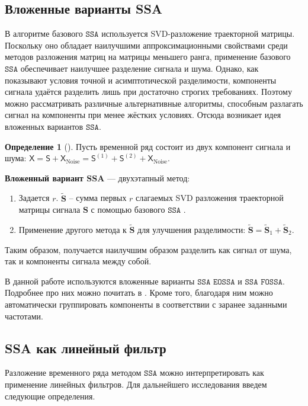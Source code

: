 \documentclass[12pt, specialist, subf
]{disser}
\theoremstyle{definition}
\newcommand{\SSA}{\texttt{SSA}}
\newcommand{\EOSSA}{\texttt{SSA EOSSA}}
\newcommand{\FOSSA}{\texttt{SSA FOSSA}}
\newcommand{\TS}{\mathsf{X}}
\newtheorem{definition}{Определение} %
\begin{document}
\subsection{Вложенные варианты SSA}
\label{sec:eossa_and_autogroup}

В алгоритме базового $\SSA$ используется SVD-разложение траекторной матрицы. Поскольку оно обладает наилучшими аппроксимационными свойствами среди методов разложения матриц на матрицы меньшего ранга, применение базового $\SSA$ обеспечивает наилучшее разделение сигнала и шума. Однако, как показывают условия точной и асимптотической разделимости, компоненты сигнала удаётся разделить лишь при достаточно строгих требованиях. Поэтому можно рассматривать различные альтернативные алгоритмы, способным разлагать сигнал на компоненты при менее жёстких условиях.
Отсюда возникает идея вложенных вариантов $\SSA$.

\begin{definition}[\cite{Golyandina_2015}]

	Пусть временной ряд состоит из двух компонент сигнала и шума: $\TS = \mathsf{S} + \TS_{\mathrm{Noise}}=
		\mathsf{S}^{(1)} + \mathsf{S}^{(2)} + \TS_{\mathrm{Noise}}$.

	\textbf{Вложенный вариант SSA} — двухэтапный метод:
	\begin{enumerate}
		\item Задается $r$. $\tilde {\mathbf{S}}$ -- сумма первых $r$ слагаемых SVD разложения траекторной матрицы сигнала $\mathbf S$ с помощью базового $\SSA$ .
		\item Применение другого метода к $\tilde{\mathbf{S}}$ для улучшения разделимости: $\tilde{\mathbf{S }} = \tilde{\mathbf{S}}_1 + \tilde{\mathbf{S } }_2$.
	\end{enumerate}
\end{definition}


Таким образом, получается наилучшим образом разделить как сигнал от шума, так и компоненты сигнала между собой.

В данной работе используются вложенные варианты $\EOSSA$ и $\FOSSA$. Подробнее про них можно почитать в \cite{golyandina2023intelligent}. Кроме того, благодаря ним можно автоматически группировать компоненты в соответствии с заранее заданными частотами.



\subsection{SSA как линейный фильтр}
Разложение временного ряда методом $\SSA$ можно интерпретировать как применение линейных фильтров. Для дальнейшего исследования введем следующие определения.
\end{document}
